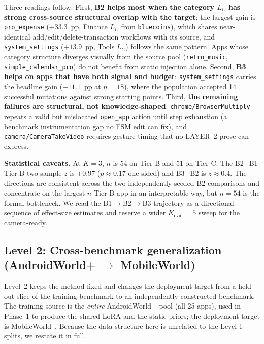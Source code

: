Three readings follow. First, \textbf{B2 helps most when the category $L_C$ has
strong cross-source structural overlap with the target}: the largest gain is
\texttt{pro\_expense} ($+33.3$~pp, Finance $L_C$ from \texttt{bluecoins}), which
shares near-identical add/edit/delete-transaction workflows with its source, and
\texttt{system\_settings} ($+13.9$~pp, Tools $L_C$) follows the same pattern.
Apps whose category structure diverges visually from the source pool
(\texttt{retro\_music}, \texttt{simple\_calendar\_pro}) do not benefit from
static injection alone. Second, \textbf{B3 helps on apps that have both signal
and budget}: \texttt{system\_settings} carries the headline gain ($+11.1$~pp at
$n{=}18$), where the population accepted 14 successful mutations against strong
starting points. Third, \textbf{the remaining failures are structural, not
knowledge-shaped}: \texttt{chrome/BrowserMultiply} repeats a valid but
mislocated \texttt{open\_app} action until step exhaustion (a benchmark
instrumentation gap no FSM edit can fix), and \texttt{camera/CameraTakeVideo}
requires gesture timing that no LAYER~2 prose can express.

\textbf{Statistical caveats.} At $K{=}3$, $n$ is 54 on Tier-B and 51 on Tier-C.
The B2$-$B1 Tier-B two-sample $z$ is $+0.97$ ($p\approx0.17$ one-sided) and
B3$-$B2 is $z\approx0.4$. The directions are consistent across the two
independently seeded B2 comparisons and concentrate on the largest-$n$ Tier-B
app in an interpretable way, but $n{=}54$ is the formal bottleneck. We read the
B1$\to$B2$\to$B3 trajectory as a directional sequence of effect-size estimates
and reserve a wider $K_{\text{eval}}{=}5$ sweep for the camera-ready.

\subsection{Level 2: Cross-benchmark generalization (AndroidWorld+ $\to$ MobileWorld)}
\label{sec:exp-cross}

Level~2 keeps the method fixed and changes the deployment target from a
held-out slice of the training benchmark to an independently constructed
benchmark. The training source is the \emph{entire} AndroidWorld+ pool (all 25
apps), used in Phase~1 to produce the shared LoRA and the static priors; the
deployment target is MobileWorld~\citep{mobileworld2025}. Because
the data structure here is unrelated to the Level-1 splits, we restate it in
full.

